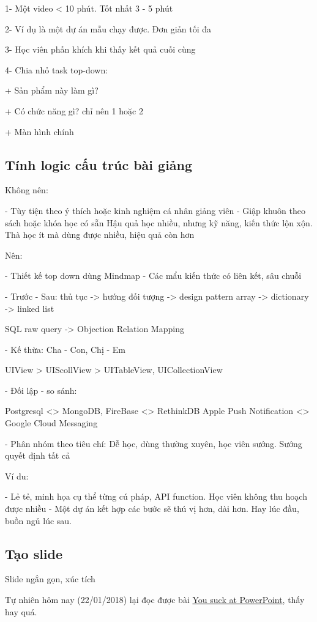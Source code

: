 1- Một video < 10 phút. Tốt nhất 3 - 5 phút

2- Ví dụ là một dự án mẫu chạy được. Đơn giản tối đa

3- Học viên phấn khích khi thấy kết quả cuối cùng

4- Chia nhỏ task top-down:

+ Sản phẩm này làm gì?

+ Có chức năng gì? chỉ nên 1 hoặc 2

+ Màn hình chính

\subsection{Tính logic cấu trúc bài giảng}

Không nên:

- Tùy tiện theo ý thích hoặc kinh nghiệm cá nhân giảng viên
- Giập khuôn theo sách hoặc khóa học có sẵn
Hậu quả học nhiều, nhưng kỹ năng, kiến thức lộn xộn. Thà học ít mà dùng được nhiều, hiệu quả còn hơn

Nên:

- Thiết kế top down dùng Mindmap
- Các mẩu kiến thức có liên kết, sâu chuỗi

- Trước - Sau:
thủ tục -> hướng đối tượng -> design pattern
array -> dictionary -> linked list

SQL raw query -> Objection Relation Mapping

- Kế thừa: Cha - Con, Chị - Em

UIView > UIScollView > UITableView, UICollectionView

- Đối lập - so sánh:

Postgresql <> MongoDB, FireBase <> RethinkDB
Apple Push Notification <> Google Cloud Messaging

- Phân nhóm theo tiêu chí: Dễ học, dùng thường xuyên, học viên sướng. Sướng quyết định tất cả

Ví du:

- Lẻ tẻ, minh họa cụ thể từng cú pháp, API function. Học viên không thu hoạch được nhiều
- Một dự án kết hợp các bước sẽ thú vị hơn, dài hơn. Hay lúc đầu, buồn ngủ lúc sau.

\subsection{Tạo slide}

Slide ngắn gọn, xúc tích

Tự nhiên hôm nay (22/01/2018) lại đọc được bài \href{https://huynq.net/you-suck-at-powerpoint/}{You suck at PowerPoint}, thấy hay quá.

